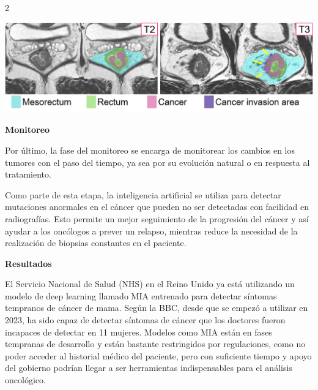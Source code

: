 \documentclass[12pt,spanish,Letterpaper,openany]{book}
\begin{document}
\begin {multicols}{2}
\begin {flushleft}
\noindent\begin{minipage}[c]{\columnwidth}

\begin{center}\includegraphics[width=1\linewidth]{imagenes_articulos/sp21_02} \end{center}

\end{minipage}
\end {flushleft}

\textbf{Monitoreo}

Por último, la fase del monitoreo se encarga de monitorear los cambios en los tumores con el paso del tiempo, ya sea por su evolución natural o en respuesta al tratamiento.

Como parte de esta etapa, la inteligencia artificial se utiliza para detectar mutaciones anormales en el cáncer que pueden no ser detectadas con facilidad en radiografías. Esto permite un mejor seguimiento de la progresión del cáncer y así ayudar a los oncólogos a prever un relapso, mientras reduce la necesidad de la realización de biopsias constantes en el paciente.

\textbf{Resultados}

El Servicio Nacional de Salud (NHS) en el Reino Unido ya está utilizando un modelo de deep learning llamado MIA entrenado para detectar síntomas tempranos de cáncer de mama.
Según la BBC, desde que se empezó a utilizar en 2023, ha sido capaz de detectar síntomas de cáncer que los doctores fueron incapaces de detectar en 11 mujeres. Modelos como MIA están en fases tempranas de desarrollo y están bastante restringidos por regulaciones, como no poder acceder al historial médico del paciente, pero con suficiente tiempo y apoyo del gobierno podrían llegar a ser herramientas indispensables para el análisis oncológico.

\begin {flushleft}
\noindent\begin{minipage}[c]{\columnwidth}


\end{minipage}
\end{flushleft}
\end{multicols}
\end{document}
